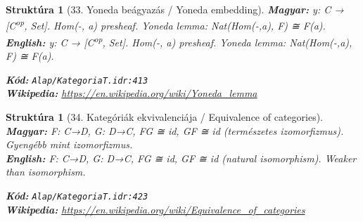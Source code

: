 \documentclass[11pt,a4paper,twocolumn]{article}
\newtheorem{struktura}[tetel]{Struktúra}
\begin{document}
\begin{struktura}[33. Yoneda beágyazás / Yoneda embedding]

\textbf{Magyar:} y: C → [C\textsuperscript{op}, Set]. Hom(-, a) presheaf. Yoneda lemma: Nat(Hom(-,a), F) ≅ F(a).\\

\textbf{English:} y: C → [C\textsuperscript{op}, Set]. Hom(-, a) presheaf. Yoneda lemma: Nat(Hom(-,a), F) ≅ F(a).\\

\begin{center}
\end{center}

\textbf{Kód:} \texttt{Alap/KategoriaT.idr:413}\\
\textbf{Wikipedia:} \url{https://en.wikipedia.org/wiki/Yoneda_lemma}

\end{struktura}

\vspace{0.5cm}

\begin{struktura}[34. Kategóriák ekvivalenciája / Equivalence of categories]

\textbf{Magyar:} F: C→D, G: D→C, FG ≅ id, GF ≅ id (természetes izomorfizmus). Gyengébb mint izomorfizmus.\\

\textbf{English:} F: C→D, G: D→C, FG ≅ id, GF ≅ id (natural isomorphism). Weaker than isomorphism.\\

\begin{center}
\end{center}

\textbf{Kód:} \texttt{Alap/KategoriaT.idr:423}\\
\textbf{Wikipedia:} \url{https://en.wikipedia.org/wiki/Equivalence_of_categories}

\end{struktura}

\vspace{0.5cm}
\end{document}
